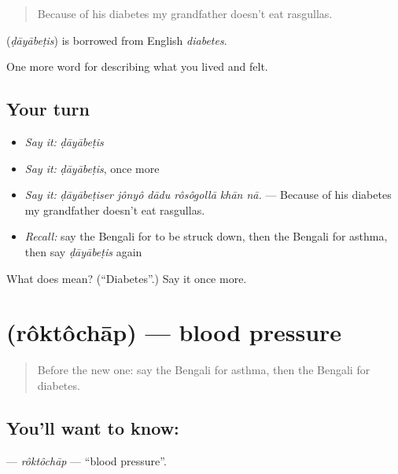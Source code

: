 \begin{quote}
Because of his diabetes my grandfather doesn't eat rasgullas.
\end{quote}

\begin{cousinweb}
\textbf{} (\emph{ḍāyābeṭis}) is borrowed from English \emph{diabetes}.
\end{cousinweb}

\begin{grammarlens}[title={What you've built}]
One more word for describing what you lived and felt.
\end{grammarlens}

\subsection*{Your turn}
\begin{itemize}
\raggedright
  \item \emph{Say it:} \emph{ḍāyābeṭis}
  \item \emph{Say it:} \emph{ḍāyābeṭis}, once more
  \item \emph{Say it:} \emph{ḍāyābeṭiser jônyô dādu rôsôgollā khān nā.} — Because of his diabetes my grandfather doesn't eat rasgullas.
  \item \emph{Recall:} say the Bengali for to be struck down, then the Bengali for asthma, then say \emph{ḍāyābeṭis} again
\end{itemize}

\begin{tcolorbox}[breakable,colback=teal!4,colframe=teal!35!black,title={Before you move on}]
What does  mean? (\textquotedblleft{}Diabetes\textquotedblright{}.) Say it once more.
\end{tcolorbox}
\section[\texorpdfstring{\bn{রক্তচাপ} (rôktôchāp)}{রক্তচাপ (rôktôchāp)}]{ (rôktôchāp) — blood pressure}

\label{lesson:BN-C474-roktochap}



\begin{quote}
Before the new one: say the Bengali for asthma, then the Bengali for diabetes.
\end{quote}

\subsection*{You'll want to know: }
\textbf{} — \emph{rôktôchāp} — \textquotedblleft{}blood pressure\textquotedblright{}.

